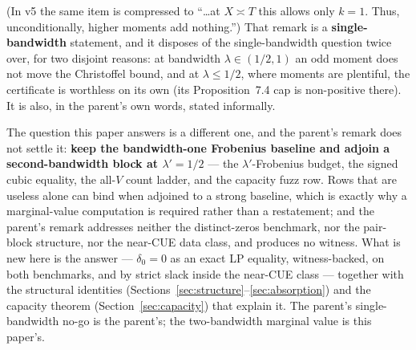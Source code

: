\documentclass[11pt]{article}
\theoremstyle{plain}
\theoremstyle{definition}
\theoremstyle{remark}
\begin{document}
(In v5 the same item is compressed to ``\ldots at $X \asymp T$ this allows only
$k = 1$. Thus, unconditionally, higher moments add nothing.'') That remark is a
\textbf{single-bandwidth} statement, and it disposes of the single-bandwidth
question twice over, for two disjoint reasons: at bandwidth
$\lambda \in (1/2, 1)$ an odd moment does not move the Christoffel bound, and at
$\lambda \le 1/2$, where moments are plentiful, the certificate is worthless on
its own (its Proposition~7.4 cap is non-positive there). It is also, in the
parent's own words, stated informally.

The question this paper answers is a different one, and the parent's remark does
not settle it: \textbf{keep the bandwidth-one Frobenius baseline and adjoin a
second-bandwidth block at $\lambda' = 1/2$} --- the $\lambda'$-Frobenius budget,
the signed cubic equality, the all-$V$ count ladder, and the capacity fuzz row.
Rows that are useless alone can bind when adjoined to a strong baseline, which is
exactly why a marginal-value computation is required rather than a restatement;
and the parent's remark addresses neither the distinct-zeros benchmark, nor the
pair-block structure, nor the near-CUE data class, and produces no witness. What
is new here is the answer --- $\delta_0 = 0$ as an exact LP equality,
witness-backed, on both benchmarks, and by strict slack inside the near-CUE
class --- together with the structural identities
(Sections~\ref{sec:structure}--\ref{sec:absorption}) and the capacity theorem
(Section~\ref{sec:capacity}) that explain it. The parent's single-bandwidth
no-go is the parent's; the two-bandwidth marginal value is this paper's.
\end{document}
